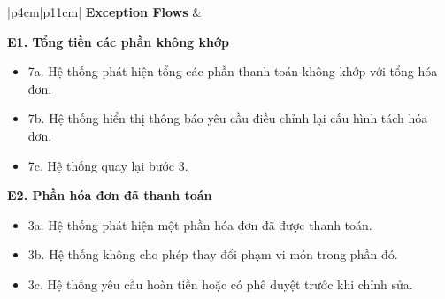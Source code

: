 \begin{longtable}{|p{4cm}|p{11cm}|}
\textbf{Exception Flows} &
\begin{minipage}[t]{\linewidth}
\vspace{0.3mm}

\textbf{E1. Tổng tiền các phần không khớp}

\begin{itemize}
\item 7a. Hệ thống phát hiện tổng các phần thanh toán không khớp với tổng hóa đơn.
\item 7b. Hệ thống hiển thị thông báo yêu cầu điều chỉnh lại cấu hình tách hóa đơn.
\item 7c. Hệ thống quay lại bước 3.
\end{itemize}

\textbf{E2. Phần hóa đơn đã thanh toán}

\begin{itemize}
\item 3a. Hệ thống phát hiện một phần hóa đơn đã được thanh toán.
\item 3b. Hệ thống không cho phép thay đổi phạm vi món trong phần đó.
\item 3c. Hệ thống yêu cầu hoàn tiền hoặc có phê duyệt trước khi chỉnh sửa.
\end{itemize}

\vspace{0.3mm}
\end{minipage}
\\ \hline

\end{longtable}

